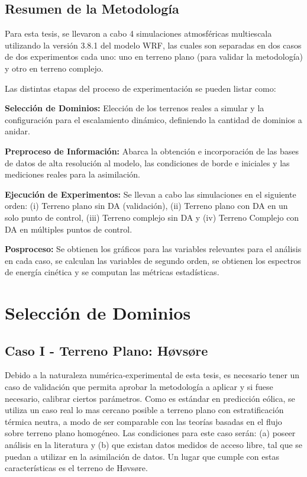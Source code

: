 \subsection{Resumen de la Metodología}
Para esta tesis, se llevaron a cabo 4 simulaciones atmosféricas multiescala utilizando la versión 3.8.1 del modelo WRF, las cuales son separadas en dos casos de dos experimentos cada uno: uno en terreno plano (para validar la metodología) y otro en terreno complejo.

Las distintas etapas del proceso de experimentación se pueden listar como:
\begin{enumerate*}
	\item \textbf{Selección de Dominios: } Elección de los terrenos reales a simular y la configuración para el escalamiento dinámico, definiendo la cantidad de dominios a anidar.
	\item \textbf{Preproceso de Información:} Abarca la obtención e incorporación de las bases de datos de alta resolución al modelo, las condiciones de borde e iniciales y las mediciones reales para la asimilación.
	\item \textbf{Ejecución de Experimentos:} Se llevan a cabo las simulaciones en el siguiente orden: (i) Terreno plano sin DA (validación), (ii) Terreno plano con DA en un solo punto de control, (iii) Terreno complejo sin DA y (iv) Terreno Complejo con DA en múltiples puntos de control.
	\item \textbf{Posproceso:} Se obtienen los gráficos para las variables relevantes para el análisis en cada caso, se calculan las variables de segundo orden, se obtienen los espectros de energía cinética y se computan las métricas estadísticas.
\end{enumerate*}
\newpage
\section{Selección de Dominios}
\subsection{Caso I - Terreno Plano: Høvsøre}
 Debido a la naturaleza numérica-experimental de esta tesis, es necesario tener un caso de validación que permita aprobar la metodología a aplicar y si fuese necesario, calibrar ciertos parámetros. Como es estándar en predicción eólica, se utiliza un caso real lo mas cercano posible a terreno plano con estratificación térmica neutra, a modo de ser comparable con las teorías basadas en el flujo sobre terreno plano homogéneo. Las condiciones para este caso serán: (a) poseer análisis en la literatura y (b) que existan datos medidos de acceso libre, tal que se puedan a utilizar en la asimilación de datos. Un lugar que cumple con estas características es el terreno de Høvsøre.

